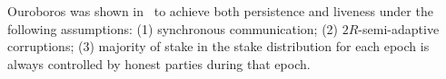Ouroboros was shown in~\cite{C:KRDO17} to achieve
both persistence and liveness
under the following assumptions:
(1) synchronous communication;
(2) $2R$-semi-adaptive corruptions;
(3) majority of stake in the stake distribution for each epoch is
always controlled by honest parties during that epoch.
